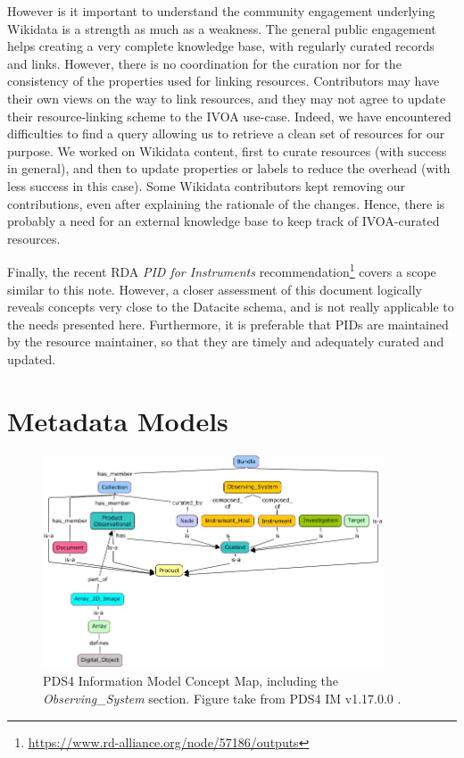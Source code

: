 \documentclass[11pt,a4paper]{ivoa}
\begin{document}
However is it important to understand the community engagement
underlying Wikidata is a strength as much as a weakness. The
general public engagement helps creating a very complete
knowledge base, with regularly curated records and links. However,
there is no coordination for the curation nor for the consistency
of the properties used for linking resources. Contributors may
have their own views on the way to link resources, and they may not
agree to update their resource-linking scheme to the IVOA use-case.
Indeed, we have encountered difficulties to find a query allowing us
to retrieve a clean set of resources for our purpose. We worked on
Wikidata content, first to curate resources (with success in general),
and then to update properties or labels to reduce the overhead (with
less success in this case). Some Wikidata contributors kept removing
our contributions, even after explaining the rationale of the changes.
Hence, there is probably a need for an external knowledge base to
keep track of IVOA-curated resources.

Finally, the recent RDA \emph{PID for Instruments}
recommendation\footnote{\url{https://www.rd-alliance.org/node/57186/outputs}}
covers a scope similar to this note. However, a closer
assessment of this document logically reveals concepts very
close to the Datacite schema, and is not really applicable to
the needs presented here. Furthermore, it is preferable that
PIDs are maintained by the resource maintainer, so that they
are timely and adequately curated and updated.

\appendix
\section{Metadata Models}
\label{appendix:models}

\begin{figure}
\centering\includegraphics[width=0.9\textwidth]{pds4-concept-map.jpg}
\caption{PDS4 Information Model Concept Map, including the
\emph{Observing\_System} section. Figure take from PDS4 IM v1.17.0.0
\protect\citep{pds4-im-v1H00}.}\label{fig:pds4-concept-map}
\end{figure}
\end{document}
